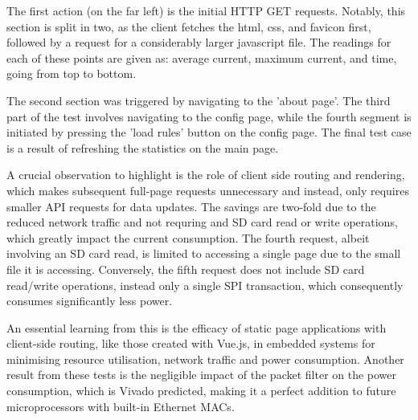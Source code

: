 The first action (on the far left) is the initial HTTP GET requests. Notably, this section is split in two, as the client fetches the html, css, and favicon first, followed by a request for a considerably larger javascript file. The readings for each of these points are given as: average current, maximum current, and time, going from top to bottom.

The second section was triggered by navigating to the 'about page'. The third part of the test involves navigating to the config page, while the fourth segment is initiated by pressing the 'load rules' button on the config page. The final test case is a result of refreshing the statistics on the main page.

A crucial observation to highlight is the role of client side routing and rendering, which makes subsequent full-page requests unnecessary and instead, only requires smaller API requests for data updates. The savings are two-fold due to the reduced network traffic and not requring and SD card read or write operations, which greatly impact the current consumption. The fourth request, albeit involving an SD card read, is limited to accessing a single page due to the small file it is accessing. Conversely, the fifth request does not include SD card read/write operations, instead only a single SPI transaction, which consequently consumes significantly less power.

An essential learning from this is the efficacy of static page applications with client-side routing, like those created with Vue.js, in embedded systems for minimising resource utilisation, network traffic and power consumption. Another result from these tests is the negligible impact of the packet filter on the power consumption, which is Vivado predicted, making it a perfect addition to future microprocessors with built-in Ethernet MACs.
